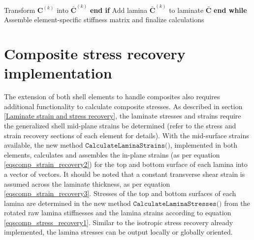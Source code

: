 \begin{algorithm}
\begin{algorithmic}[1]
		\State \hspace{\algorithmicindent} \hspace{\algorithmicindent} \hspace{\algorithmicindent} \hspace{\algorithmicindent} \hspace{\algorithmicindent} Transform $\mathbf{C}^{(k)}$ into $\bar{\mathbf{C}}^{(k)}$
		\State \hspace{\algorithmicindent} \hspace{\algorithmicindent} \hspace{\algorithmicindent} \hspace{\algorithmicindent}\textbf{end if}
		\State \hspace{\algorithmicindent} \hspace{\algorithmicindent} \hspace{\algorithmicindent} \hspace{\algorithmicindent}Add lamina $\bar{\mathbf{C}}^{(k)}$ to laminate $\bar{\mathbf{C}}$
		\State \hspace{\algorithmicindent} \hspace{\algorithmicindent} \hspace{\algorithmicindent} \textbf{end while}
		\State \hspace{\algorithmicindent}Assemble element-specific stiffness matrix and finalize calculations
	\end{algorithmic}
\end{algorithm}

\section{Composite stress recovery implementation}
\label{composite stress recovery}
The extension of both shell elements to handle composites also requires additional functionality to calculate composite stresses. As described in section \ref{Laminate strain and stress recovery}, the laminate stresses and strains require the generalized shell mid-plane strains be determined (refer to the stress and strain recovery sections of each element for details). With the mid-surface strains available, the new method $\texttt{CalculateLaminaStrains()}$, implemented in both elements, calculates and assembles the in-plane strains (as per equation \ref{eqscomp_strain_recovery2}) for the top and bottom surface of each lamina into a vector of vectors. It should be noted that a constant transverse shear strain is assumed across the laminate thickness, as per equation \ref{eqscomp_strain_recovery3}. Stresses of the top and bottom surfaces of each lamina are determined in the new method $\texttt{CalculateLaminaStresses()}$ from the rotated raw lamina stiffnesses and the lamina strains according to equation \ref{eqscomp_stress_recovery1}. Similar to the isotropic stress recovery already implemented, the lamina stresses can be output locally or globally oriented.

